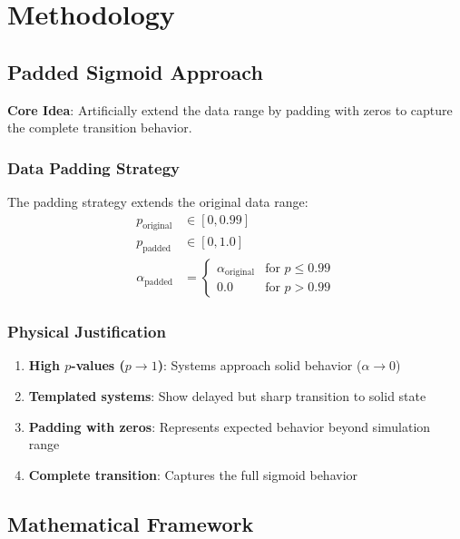 \documentclass[11pt]{article}
\begin{document}
\section{Methodology}

\subsection{Padded Sigmoid Approach}

\textbf{Core Idea}: Artificially extend the data range by padding with zeros to capture the complete transition behavior.

\subsubsection{Data Padding Strategy}

The padding strategy extends the original data range:
\begin{align}
    p_{\text{original}} &\in [0, 0.99] \\
    p_{\text{padded}} &\in [0, 1.0] \\
    \alpha_{\text{padded}} &= \begin{cases}
        \alpha_{\text{original}} & \text{for } p \leq 0.99 \\
        0.0 & \text{for } p > 0.99
    \end{cases}
\end{align}

\subsubsection{Physical Justification}

\begin{enumerate}
    \item \textbf{High $p$-values ($p \to 1$)}: Systems approach solid behavior ($\alpha \to 0$)
    \item \textbf{Templated systems}: Show delayed but sharp transition to solid state
    \item \textbf{Padding with zeros}: Represents expected behavior beyond simulation range
    \item \textbf{Complete transition}: Captures the full sigmoid behavior
\end{enumerate}

\subsection{Mathematical Framework}
\end{document}
